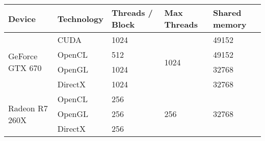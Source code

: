 \begin{tabular}{|l|l|l|l|l|}
	\hline
	Device & Technology & Threads / Block & Max Threads & Shared memory \\ \hline
	\multirow{4}{*}{GeForce GTX 670} & CUDA & 1024 & \multirow{4}{*}{1024} & 49152 \\
	{} & OpenCL & 512 & {} & 49152 \\
	{} & OpenGL & 1024 & {} & 32768 \\
	{} & DirectX & 1024 & {} & 32768 \\ \hline
	\multirow{3}{*}{Radeon R7 260X} & OpenCL & 256 & \multirow{3}{*}{256} & \multirow{3}{*}{32768} \\
	& OpenGL & 256 & {} & {} \\
	& DirectX & 256 & {} & {} \\ \hline
\end{tabular}